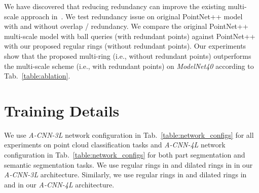 \documentclass[10pt,twocolumn,letterpaper]{article}
\begin{document}
\begin{table}[h]
\centering
\caption{Experiments on redundancy on \emph{ModelNet40} dataset. AAC is accuracy average class, OA is overall accuracy.}\vspace{-2mm}
\vspace{-2mm}
\label{table:ablation}
\end{table}


We have discovered that reducing redundancy can improve the existing multi-scale approach in~\cite{qi2017pointnet++}. We test redundancy issue on original PointNet++ model~\cite{qi2017pointnet++} with and without overlap / redundancy. We compare the original PointNet++ multi-scale model with ball queries (with redundant points) against PointNet++ with our proposed regular rings (without redundant points). Our experiments show that the proposed multi-ring (i.e., without redundant points) outperforms the multi-scale scheme (i.e., with redundant points) on \emph{ModelNet40} according to Tab.~\ref{table:ablation}.

\vspace{-1mm}
\section{Training Details}
\label{sec:suppl_training_details} 
\vspace{-1.5mm}
We use \textit{A-CNN-3L} network configuration in Tab.~\ref{table:network_configs} for all experiments on point cloud classification tasks and \textit{A-CNN-4L} network configuration in Tab.~\ref{table:network_configs} for both part segmentation and semantic segmentation tasks. We use regular rings in  and dilated rings in  in our \textit{A-CNN-3L} architecture. Similarly, we use regular rings in  and dilated rings in  and  in our \textit{A-CNN-4L} architecture.
\end{document}
